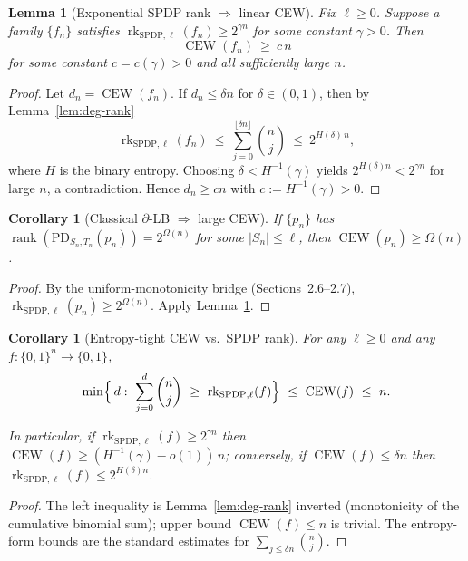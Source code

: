 \documentclass[12pt]{article}
\newtheorem{lemma}[theorem]{Lemma}
\newtheorem{corollary}[theorem]{Corollary}
\theoremstyle{definition}
\theoremstyle{definition}
\theoremstyle{remark}
\theoremstyle{remark}
\begin{document}
\begin{lemma}[Exponential SPDP rank $\Rightarrow$ linear CEW]\label{lem:exp-rank-linear-cew}
Fix $\ell\ge 0$. Suppose a family $\{f_n\}$ satisfies $\operatorname{rk}_{\mathrm{SPDP},\ell}(f_n)\ge 2^{\gamma n}$ for some constant $\gamma>0$. Then
\[
\operatorname{CEW}(f_n) \ \ge\ c\,n
\]
for some constant $c=c(\gamma)>0$ and all sufficiently large $n$.
\end{lemma}

\begin{proof}
Let $d_n=\operatorname{CEW}(f_n)$. If $d_n\le\delta n$ for $\delta\in(0,1)$, then by Lemma~\ref{lem:deg-rank}
\[
\operatorname{rk}_{\mathrm{SPDP},\ell}(f_n) \ \le\ \sum_{j=0}^{\lfloor\delta n\rfloor} \binom{n}{j} \ \le\ 2^{H(\delta)\,n},
\]
where $H$ is the binary entropy. Choosing $\delta<H^{-1}(\gamma)$ yields $2^{H(\delta)n}<2^{\gamma n}$ for large $n$, a contradiction. Hence $d_n\ge cn$ with $c:=H^{-1}(\gamma)>0$.
\end{proof}

\begin{corollary}[Classical $\partial$-LB $\Rightarrow$ large CEW]\label{cor:classical-lb-cew}
If $\{p_n\}$ has $\operatorname{rank}(\mathrm{PD}_{S_n,T_n}(p_n))=2^{\Omega(n)}$ for some $|S_n|\le\ell$, then $\operatorname{CEW}(p_n)\ge\Omega(n)$.
\end{corollary}

\begin{proof}
By the uniform-monotonicity bridge (Sections~2.6--2.7), $\operatorname{rk}_{\mathrm{SPDP},\ell}(p_n)\ge 2^{\Omega(n)}$. Apply Lemma~\ref{lem:exp-rank-linear-cew}.
\end{proof}

\begin{corollary}[Entropy-tight CEW vs.\ SPDP rank]\label{cor:entropy-tight}
For any $\ell\ge 0$ and any $f:\{0,1\}^n\to\{0,1\}$,
\[
\min\Bigl\{\,d:\ \sum_{j=0}^d\binom{n}{j}\ \ge\ \operatorname{rk}_{\mathrm{SPDP},\ell}(f)\Bigr\} \ \le\ \operatorname{CEW}(f) \ \le\ n.
\]

In particular, if $\operatorname{rk}_{\mathrm{SPDP},\ell}(f)\ge 2^{\gamma n}$ then $\operatorname{CEW}(f)\ge(H^{-1}(\gamma)-o(1))\,n$; conversely, if $\operatorname{CEW}(f)\le\delta n$ then $\operatorname{rk}_{\mathrm{SPDP},\ell}(f)\le 2^{H(\delta)n}$.
\end{corollary}

\begin{proof}
The left inequality is Lemma~\ref{lem:deg-rank} inverted (monotonicity of the cumulative binomial sum); upper bound $\operatorname{CEW}(f)\le n$ is trivial. The entropy-form bounds are the standard estimates for $\sum_{j\le\delta n}\binom{n}{j}$.
\end{proof}
\end{document}
